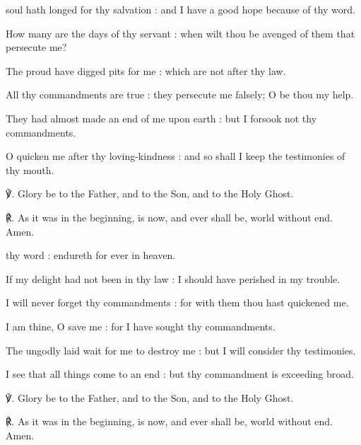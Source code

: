 \begin{multicols}{2}
 soul hath longed for thy salvation : and I have a good hope because of thy word.\par
{}
How many are the days of thy servant : when wilt thou be avenged of them that persecute me?\par
{}The proud have digged pits for me : which are not after thy law.\par
{}All thy commandments are true : they persecute me falsely; O be thou my help.\par
{}They had almost made an end of me upon earth : but I forsook not thy commandments.\par
{}O quicken me after thy loving-kindness : and so shall I keep the testimonies of thy mouth.\par
℣. Glory be to the Father, and to the Son, and to the Holy Ghost.\par
℟. As it was in the beginning, is now, and ever shall be, world without end. Amen.

 thy word : endureth for ever in heaven.\par
{}
If my delight had not been in thy law : I should have perished in my trouble.\par
{}I will never forget thy commandments : for with them thou hast quickened me.\par
{}I am thine, O save me : for I have sought thy commandments.\par
{}The ungodly laid wait for me to destroy me : but I will consider thy testimonies.\par
{}I see that all things come to an end : but thy commandment is exceeding broad.\par
℣. Glory be to the Father, and to the Son, and to the Holy Ghost.\par
℟. As it was in the beginning, is now, and ever shall be, world without end. Amen.


\end{multicols}

